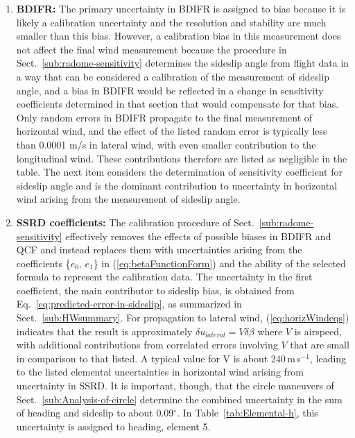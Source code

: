 \documentclass[12pt,twoside,english]{article}\usepackage[]{graphicx}\usepackage[]{color}
\begin{document}
\begin{enumerate}
\item \textbf{BDIFR:} 
The primary uncertainty in BDIFR is assigned to bias because it is likely a calibration uncertainty and the resolution and stability are much smaller than this bias. However, a calibration bias in this measurement does not affect the final wind measurement because the procedure in Sect.~\ref{sub:radome-sensitivity} determines the sideslip angle from flight data in a way that can be considered a calibration of the measurement of sideslip angle, and a bias in BDIFR would be reflected in a change in sensitivity coefficients determined in that section that would compensate for that bias. Only random errors in BDIFR propagate to the final measurement of horizontal wind, and the effect of the listed random error is typically less than 0.0001 m/s in lateral wind, with even smaller contribution to the longitudinal wind. These contributions therefore are listed as negligible in the table. The next item considers the determination of sensitivity coefficient for sideslip angle and is the dominant contribution to uncertainty in horizontal wind arising from the measurement of sideslip angle.  
\item \textbf{SSRD coefficients:} 
The calibration procedure of Sect.~\ref{sub:radome-sensitivity} effectively removes the effects of possible biases in BDIFR and QCF and instead replaces them with uncertainties arising from the coefficients \{$e_{0},\,e_{1}$\} in (\ref{eq:betaFunctionForm}) and the ability of the selected formula to represent the calibration data. The uncertainty in the first coefficient, the main contributor to sideslip bias, is obtained from Eq.~\eqref{eq:predicted-error-in-sideslip}, as summarized in Sect.~\ref{sub:HWsummary}.  For propagation to lateral wind, (\ref{eq:horizWindeqs}) indicates that the result is approximately $\delta u_{lateral}=V\delta\beta$ where $V$ is airspeed, with additional contributions from correlated errors involving $V$ that are small in comparison to that listed. A typical value for V is about 240\,m\,s$^{-1}$, leading to the listed elemental uncertainties in horizontal wind arising from uncertainty in SSRD. It is important, though, that the circle maneuvers of Sect.~\ref{sub:Analysis-of-circle} determine the combined uncertainty in the sum of heading and sideslip to about 0.09$^{\circ}$. In Table~\ref{tab:Elemental-h}, this uncertainty is assigned to heading, element 5.  

\end{enumerate}
\end{document}
